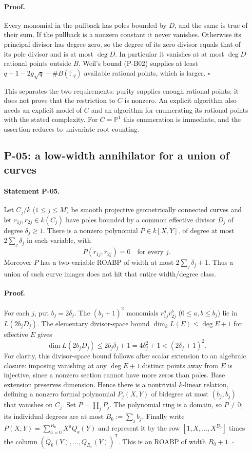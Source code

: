 \documentclass[11pt,a4paper]{article}
\theoremstyle{definition}\newtheorem{definition}{Definition}
\begin{document}
\paragraph{Proof.}
Every monomial in the pullback has poles bounded by $D$, and the same is true of their sum. If the pullback is a nonzero constant it never vanishes. Otherwise its principal divisor has degree zero, so the degree of its zero divisor equals that of its pole divisor and is at most $\deg D$. In particular it vanishes at at most $\deg D$ rational points outside $B$. Weil's bound (P-B02) supplies at least $q+1-2g\sqrt q-\#B(\mathbb F_q)$ available rational points, which is larger. $\square$

This separates the two requirements: purity supplies enough rational points; it does not prove that the restriction to $C$ is nonzero. An explicit algorithm also needs an explicit model of $C$ and an algorithm for enumerating its rational points with the stated complexity. For $C=\mathbb P^1$ this enumeration is immediate, and the assertion reduces to univariate root counting.

\subsection{P-05: a low-width annihilator for a union of curves}
\paragraph{Statement P-05.}
Let $C_j/k$ ($1\le j\le M$) be smooth projective geometrically connected curves and let $r_{1j},r_{2j}\in k(C_j)$ have poles bounded by a common effective divisor $D_j$ of degree $\delta_j\ge1$. There is a nonzero polynomial $P\in k[X,Y]$, of degree at most $2\sum_j\delta_j$ in each variable, with
\[
 P(r_{1j},r_{2j})=0\quad\text{for every }j.
\]
Moreover $P$ has a two-variable ROABP of width at most $2\sum_j\delta_j+1$. Thus a union of such curve images does not hit that entire width/degree class.
\paragraph{Proof.}
For each $j$, put $b_j=2\delta_j$. The $(b_j+1)^2$ monomials $r_{1j}^a r_{2j}^b$ ($0\le a,b\le b_j$) lie in $L(2b_jD_j)$. The elementary divisor-space bound $\dim_k L(E)\le\deg E+1$ for effective $E$ gives
\[
 \dim L(2b_jD_j)\le2b_j\delta_j+1=4\delta_j^2+1<(2\delta_j+1)^2.
\]
For clarity, this divisor-space bound follows after scalar extension to an algebraic closure: imposing vanishing at any $\deg E+1$ distinct points away from $E$ is injective, since a nonzero section cannot have more zeros than poles. Base extension preserves dimension. Hence there is a nontrivial $k$-linear relation, defining a nonzero formal polynomial $P_j(X,Y)$ of bidegree at most $(b_j,b_j)$ that vanishes on $C_j$. Set $P=\prod_jP_j$. The polynomial ring is a domain, so $P\ne0$; its individual degrees are at most $B_0:=\sum_jb_j$. Finally write $P(X,Y)=\sum_{a=0}^{B_0}X^a Q_a(Y)$ and represent it by the row $[1,X,\ldots,X^{B_0}]$ times the column $(Q_0(Y),\ldots,Q_{B_0}(Y))^{\mathsf T}$. This is an ROABP of width $B_0+1$. $\square$
\end{document}
